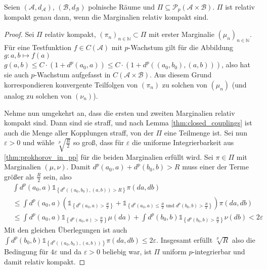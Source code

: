 \begin{corollary}\label{thm:relatively_compact_marginales}
Seien $(\mathcal{A}, d_\mathcal{A})$, $(\mathcal{B}, d_{\mathcal{B}})$ polnische Räume und $\Pi \subseteq \mathcal{P}_p(\mathcal{A} \times \mathcal{B})$. $\Pi$ ist relativ kompakt genau dann, wenn die Marginalien relativ kompakt sind.
\end{corollary}
\begin{proof}
Sei $\Pi$ relativ kompakt, $(\pi_n)_{n\in\mathbb{N}} \subset \Pi$ mit erster Marginalie $(\mu_n)_{n\in\mathbb{N}}$. Für eine Testfunktion $f \in C(\mathcal{A})$ mit $p$-Wachstum gilt für die Abbildung $g: a,b \mapsto f(a)$ $g(a,b) \leq C\cdot (1+d^p(a_0, a)) \leq C\cdot (1+ d^p((a_0, b_0), (a, b)))$, also hat sie auch $p$-Wachstum aufgefasst in $C(\mathcal{A}\times \mathcal{B})$. Aus diesem Grund korrespondieren konvergente Teilfolgen von $(\pi_n)$ zu solchen von $(\mu_n)$ (und analog zu solchen von $(\nu_n)$).

Nehme nun umgekehrt an, dass die ersten und zweiten Marginalien relativ kompakt sind. Dann sind sie straff, und nach Lemma \ref{thm:closed_couplings} ist auch die Menge aller Kopplungen straff, von der $\Pi$ eine Teilmenge ist. Sei nun $\varepsilon>0$ und wähle $\sqrt[p]{\frac{R}{2}}$ so groß, dass für $\varepsilon$ die uniforme Integrierbarkeit aus \ref{thm:prokhorov_in_pp} für die beiden Marginalien erfüllt wird. Sei $\pi \in \Pi$ mit Marginalien $(\mu,\nu)$. 
Damit $d^p(a_0, a) + d^p(b_0, b)>R$ muss einer der Terme größer als $\frac{R}{2}$ sein, also
\begin{align*}
    &\int d^p(a_0, a) \mathds{1}_{\left\{d^p((a_0, b_0), (a,b))>R\right\}}\pi(da, db) \\
    &\leq \int d^p(a_0, a) \left(\mathds{1}_{\left\{d^p(a_0,a)>\frac{R}{2}\right\}} + \mathds{1}_{\left\{d^p(a_0,a)\leq\frac{R}{2} \text{ und } d^p(b_0, b)>\frac{R}{2}\right\}}\right)\pi(da,db) \\
    &\leq \int d^p(a_0, a) \mathds{1}_{\left\{d^p(a_0, a)>\frac{R}{2}\right\}} \mu(da) + \int d^p(b_0, b) \mathds{1}_{\left\{d^p(b_0, b)>\frac{R}{2}\right\}} \nu(db) < 2\varepsilon
\end{align*}
Mit den gleichen Überlegungen ist auch $\int d^p(b_0, b) \mathds{1}_{\left\{d^p((a_0, b_0), (a,b))\right\}}\pi(da,db) \leq 2\varepsilon$. Insgesamt erfüllt $\sqrt[p]{R}$ also die Bedingung für $4\varepsilon$ und da $\varepsilon>0$ beliebig war, ist $\Pi$ uniform $p$-integrierbar und damit relativ kompakt.

\end{proof}
